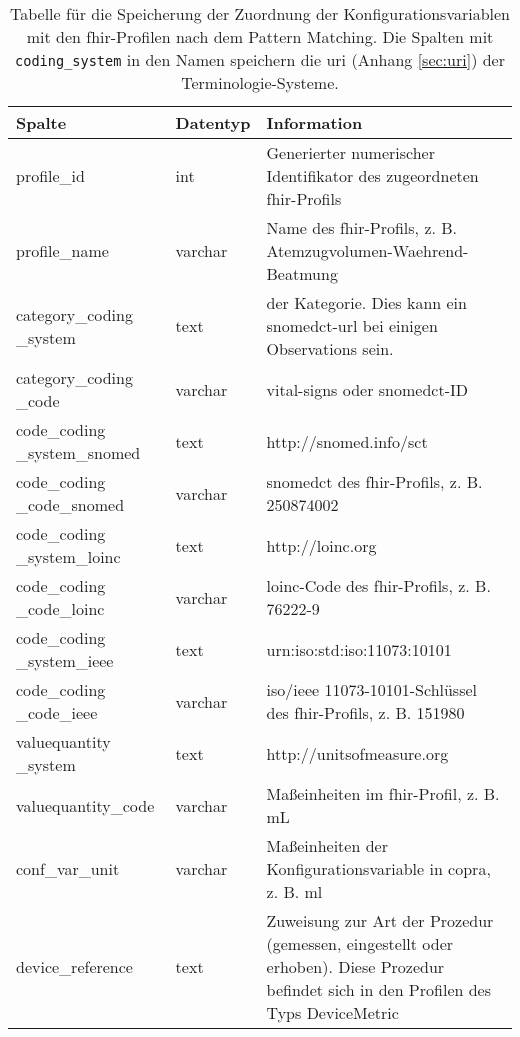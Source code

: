 \begin{longtable}{|p{3.5cm}|l|p{6.5cm}|}
	\caption[Tabelle für die Speicherung der Zuordnung der Konfigurationsvariablen mit den \acs{fhir}-Profilen]{Tabelle für die Speicherung der Zuordnung der Konfigurationsvariablen mit den \acs{fhir}-Profilen nach dem Pattern Matching. Die Spalten mit \texttt{coding\_system} in den Namen speichern die \ac{uri} (Anhang \ref{sec:uri}) der Terminologie-Systeme.}
	\label{tab:mapping}
	\endfirsthead
	\hline			
		\rowcolor{lightgray} Spalte & Datentyp & Information \\ \hline		
		profile\_id & int & Generierter numerischer Identifikator des zugeordneten \ac{fhir}-Profils \\ \hline
		profile\_name & varchar & Name des \ac{fhir}-Profils, z. B. Atemzugvolumen-Waehrend-Beatmung \\ \hline
		category\_coding \_system & text & \acsu{url} der Kategorie. Dies kann ein \ac{snomedct}-\ac{url} bei einigen \glqq Observations\grqq{} sein. \\ \hline
		category\_coding \_code & varchar & \glqq vital-signs\grqq{} oder \ac{snomedct}-ID \\ \hline
		code\_coding \_system\_snomed & text & http://snomed.info/sct \\ \hline 
		code\_coding \_code\_snomed & varchar & \ac{snomedct} des \ac{fhir}-Profils, z. B. 250874002 \\ \hline
		code\_coding \_system\_loinc & text & http://loinc.org \\ \hline
		code\_coding \_code\_loinc & varchar & \ac{loinc}-Code des \ac{fhir}-Profils, z. B. 76222-9 \\ \hline
		code\_coding \_system\_ieee & text & urn:iso:std:iso:11073:10101 \\ \hline
		code\_coding \_code\_ieee & varchar & \ac{iso}/\ac{ieee} 11073-10101\texttrademark{}-Schlüssel des \ac{fhir}-Profils, z. B. 151980 \\ \hline
		valuequantity \_system & text & http://unitsofmeasure.org \\ \hline
		valuequantity\_code & varchar & Maßeinheiten im \ac{fhir}-Profil, z. B. mL \\ \hline
		conf\_var\_unit & varchar & Maßeinheiten der Konfigurationsvariable in \ac{copra}, z. B. ml \\ \hline
		device\_reference & text & Zuweisung zur Art der Prozedur (gemessen, eingestellt oder erhoben). Diese Prozedur befindet sich in den Profilen des Typs \glqq DeviceMetric\grqq{} \\ \hline

\end{longtable}
